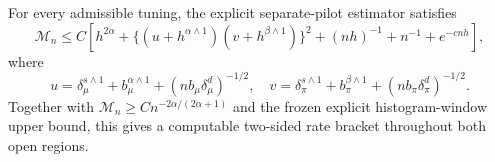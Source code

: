 For every admissible tuning, the explicit separate-pilot estimator satisfies
\[
\mathcal M_n\le C\left[h^{2\alpha}+\{(u+h^{\alpha\wedge1})(v+h^{\beta\wedge1})\}^2+(nh)^{-1}+n^{-1}+e^{-cnh}\right],
\]
where
\[
u=\delta_\mu^{s\wedge1}+b_\mu^{\alpha\wedge1}+(nb_\mu\delta_\mu^d)^{-1/2},
\quad
v=\delta_\pi^{s\wedge1}+b_\pi^{\beta\wedge1}+(nb_\pi\delta_\pi^d)^{-1/2}.
\]
Together with \(\mathcal M_n\ge Cn^{-2\alpha/(2\alpha+1)}\) and the frozen explicit histogram-window upper bound, this gives a computable two-sided rate bracket throughout both open regions.